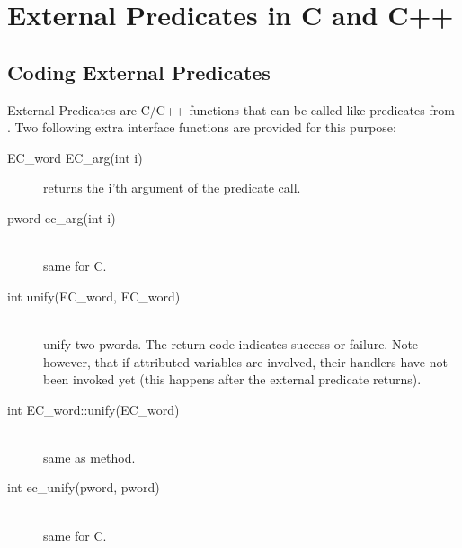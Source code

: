%
% 
% 
% 
% 

%
%
\chapter{External Predicates in C and C++}
\label{chapext}

\section{Coding External Predicates}

External Predicates are C/C++ functions that can be called like predicates
from \eclipse.
Two following extra interface functions are provided for this purpose:
\begin{description}
\item[EC_word EC_arg(int i)]
	returns the i'th argument of the predicate call.

\item[pword ec_arg(int i)]\ \\
	same for C.

\item[int unify(EC_word, EC_word)]\ \\
	unify two pwords.  The return code indicates success or
	failure.  Note however, that if attributed variables are
	involved, their handlers have not been invoked yet (this
	happens after the external predicate returns).

\item[int EC_word::unify(EC_word)]\ \\
	same as method.

\item[int ec_unify(pword, pword)]\ \\
	same for C.
\end{description}

